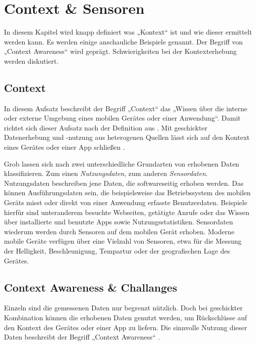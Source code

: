 \chapter{Context \& Sensoren}
\label{chap:context}

In diesem Kapitel wird knapp definiert was „Kontext“ ist und wie dieser ermittelt werden kann. Es werden einige anschauliche Beispiele genannt. Der Begriff von „Context Awareness“ wird geprägt. Schwierigkeiten bei der Kontexterhebung werden diskutiert.

\section{Context}

In diesem Aufsatz beschreibt der Begriff „Context“ das „Wissen über die interne oder externe Umgebung eines mobilen Gerätes oder einer Anwendung“. Damit richtet sich dieser Aufsatz nach der Definition aus \cite{context2015}. Mit geschickter Datenerhebung und -nutzung aus heterogenen Quellen lässt sich auf den Kontext eines Gerätes oder einer App schließen \cite{orsini2016}.

Grob lassen sich nach \cite{context2015} zwei unterschiedliche Grundarten von erhobenen Daten klassifizieren. Zum einen \textit{Nutzungsdaten}, zum anderen \textit{Sensordaten}. Nutzungsdaten beschreiben jene Daten, die softwareseitig erhoben werden. Das können Ausführungsdaten sein, die beispielsweise das Betriebssystem des mobilen Geräts misst oder direkt von einer Anwendung erfasste Benutzerdaten. Beispiele hierfür sind unteranderem besuchte Webseiten, getätigte Anrufe oder das Wissen über installierte und benutzte Apps sowie Nutzungsstatistiken. Sensordaten wiederum werden durch Sensoren auf dem mobilen Gerät erhoben. Moderne mobile Geräte verfügen über eine Vielzahl von Sensoren, etwa für die Messung der Helligkeit, Beschleunigung, Tempartur oder der geografischen Lage des Gerätes.

\section{Context Awareness \& Challanges}

Einzeln sind die gemessenen Daten nur begrenzt nützlich. Doch bei geschickter Kombination können die erhobenen Daten genutzt werden, um Rückschlüsse auf den Kontext des Gerätes oder einer App zu liefern. Die sinnvolle Nutzung dieser Daten beschreibt der Begriff „Context Awareness“ \cite{context2015, orsini2016}.

